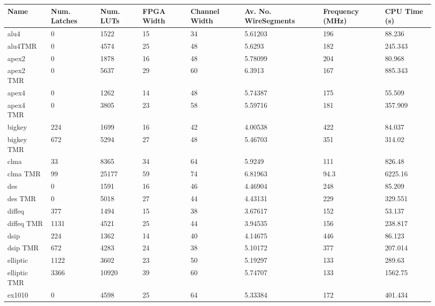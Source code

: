 \documentclass[12pt,final,oneside]{dwThesis} %
\begin{document}
   \begin{table}
      \footnotesize
      \begin{adjustwidth}{-1cm}{-1.2cm}
         \begin{tabularx}{1.1\textwidth}{llllp{1.5cm}p{2.2cm}p{1.5cm}X}
            \toprule
            Name & Num. Latches & Num. LUTs & FPGA Width & Channel Width & Av. No. Wire\newline Segments & Frequency (MHz) & CPU Time (s)\\\midrule
            alu4 & 0 & 1522 & 15 & 34 & 5.61203 & 196 & 88.236\\
            alu4TMR & 0 & 4574 & 25 & 48 & 5.6293 & 182 & 245.343\\\midrule
            apex2 & 0 & 1878 & 16 & 48 & 5.78099 & 204 & 80.968\\
            apex2 TMR & 0 & 5637 & 29 & 60 & 6.3913 & 167 & 885.343\\\midrule
            apex4 & 0 & 1262 & 14 & 48 & 5.74387 & 175 & 55.509\\
            apex4 TMR & 0 & 3805 & 23 & 58 & 5.59716 & 181 & 357.909\\\midrule
            bigkey & 224 & 1699 & 16 & 42 & 4.00538 & 422 & 84.037\\
            bigkey TMR & 672 & 5294 & 27 & 48 & 5.46703 & 351 & 314.02\\\midrule
            clma & 33 & 8365 & 34 & 64 & 5.9249 & 111 & 826.48\\
            clma TMR & 99 & 25177 & 59 & 74 & 6.81963 & 94.3 & 6225.16\\\midrule
            des & 0 & 1591 & 16 & 46 & 4.46904 & 248 & 85.209\\
            des TMR & 0 & 5018 & 27 & 44 & 4.43131 & 229 & 329.551\\\midrule
            diffeq & 377 & 1494 & 15 & 38 & 3.67617 & 152 & 53.137\\
            diffeq TMR & 1131 & 4521 & 25 & 44 & 3.94535 & 156 & 238.817\\\midrule
            dsip & 224 & 1362 & 14 & 40 & 4.14675 & 446 & 86.123\\
            dsip TMR & 672 & 4283 & 24 & 38 & 5.10172 & 377 & 207.014\\\midrule
            elliptic & 1122 & 3602 & 23 & 50 & 5.19297 & 133 & 289.63\\
            elliptic TMR & 3366 & 10920 & 39 & 60 & 5.74707 & 133 & 1562.75\\\midrule
            ex1010 & 0 & 4598 & 25 & 64 & 5.33384 & 172 & 401.434\\

\end{tabularx}
\end{adjustwidth}
\end{table}
\end{document}

